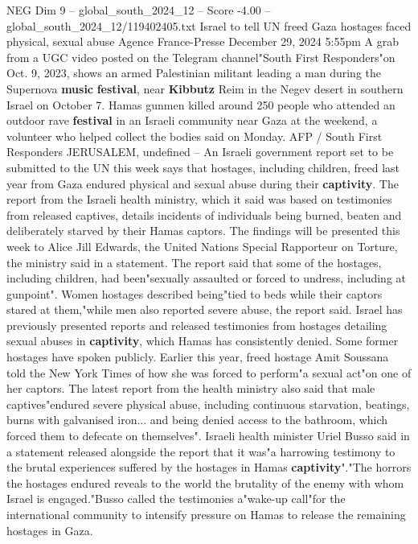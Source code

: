 \begin{textsample}{NEG Dim 9 – global\_south\_2024\_12 – Score -4.00 – global\_south\_2024\_12/119402405.txt}  \label{ex:f9_neg_219}
Israel to tell UN freed Gaza hostages faced physical, sexual abuse Agence France-Presse December 29, 2024 5:55pm A grab from a UGC video posted on the Telegram channel"South First Responders"on Oct. 9, 2023, shows an armed Palestinian militant leading a man during the Supernova \textbf{music} \textbf{festival}, near \textbf{Kibbutz} Reim in the Negev desert in southern Israel on October 7.
Hamas gunmen killed around 250 people who attended an outdoor rave \textbf{festival} in an Israeli community near Gaza at the weekend, a volunteer who helped collect the bodies said on Monday.
AFP / South First Responders JERUSALEM, undefined -- An Israeli government report set to be submitted to the UN this week says that hostages, including children, freed last year from Gaza endured physical and sexual abuse during their \textbf{captivity}.
The report from the Israeli health ministry, which it said was based on testimonies from released captives, details incidents of individuals being burned, beaten and deliberately starved by their Hamas captors.
The findings will be presented this week to Alice Jill Edwards, the United Nations Special Rapporteur on Torture, the ministry said in a statement.
The report said that some of the hostages, including children, had been"sexually assaulted or forced to undress, including at gunpoint".
Women hostages described being"tied to beds while their captors stared at them,"while men also reported severe abuse, the report said.
Israel has previously presented reports and released testimonies from hostages detailing sexual abuses in \textbf{captivity}, which Hamas has consistently denied.
Some former hostages have spoken publicly.
Earlier this year, freed hostage Amit Soussana told the New York Times of how she was forced to perform"a sexual act"on one of her captors.
The latest report from the health ministry also said that male captives"endured severe physical abuse, including continuous starvation, beatings, burns with galvanised iron... and being denied access to the bathroom, which forced them to defecate on themselves".
Israeli health minister Uriel Busso said in a statement released alongside the report that it was"a harrowing testimony to the brutal experiences suffered by the hostages in Hamas \textbf{captivity}"."The horrors the hostages endured reveals to the world the brutality of the enemy with whom Israel is engaged."Busso called the testimonies a"wake-up call"for the international community to intensify pressure on Hamas to release the remaining hostages in Gaza.

\end{textsample}
